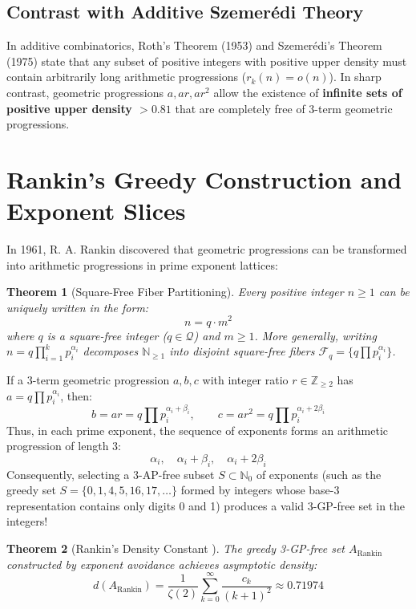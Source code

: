 \documentclass[11pt,a4paper]{article}
\newtheorem{theorem}{Theorem}[section]
\theoremstyle{definition}
\begin{document}
\subsection{Contrast with Additive Szemer\'edi Theory}
In additive combinatorics, Roth's Theorem (1953) and Szemer\'edi's Theorem (1975) state that any subset of positive integers with positive upper density must contain arbitrarily long arithmetic progressions ($r_k(n) = o(n)$).
In sharp contrast, geometric progressions $a, ar, ar^2$ allow the existence of \textbf{infinite sets of positive upper density $> 0.81$} that are completely free of 3-term geometric progressions.

\section{Rankin's Greedy Construction and Exponent Slices}

In 1961, R. A. Rankin \cite{rankin1961} discovered that geometric progressions can be transformed into arithmetic progressions in prime exponent lattices:

\begin{theorem}[Square-Free Fiber Partitioning]\label{thm:rankin_fiber}
Every positive integer $n \ge 1$ can be uniquely written in the form:
\[ n = q \cdot m^2 \]
where $q$ is a square-free integer ($q \in \mathcal{Q}$) and $m \ge 1$.
More generally, writing $n = q \prod_{i=1}^k p_i^{\alpha_i}$ decomposes $\mathbb{N}_{\ge 1}$ into disjoint square-free fibers $\mathcal{F}_q = \{ q \prod p_i^{\alpha_i} \}$.
\end{theorem}

If a 3-term geometric progression $a, b, c$ with integer ratio $r \in \mathbb{Z}_{\ge 2}$ has $a = q \prod p_i^{\alpha_i}$, then:
\[ b = a r = q \prod p_i^{\alpha_i + \beta_i}, \qquad c = a r^2 = q \prod p_i^{\alpha_i + 2\beta_i} \]
Thus, in each prime exponent, the sequence of exponents forms an arithmetic progression of length 3:
\[ \alpha_i, \quad \alpha_i + \beta_i, \quad \alpha_i + 2\beta_i \]
Consequently, selecting a 3-AP-free subset $S \subset \mathbb{N}_0$ of exponents (such as the greedy set $S = \{0, 1, 4, 5, 16, 17, \dots\}$ formed by integers whose base-3 representation contains only digits 0 and 1) produces a valid 3-GP-free set in the integers!

\begin{theorem}[Rankin's Density Constant \cite{rankin1961}]\label{thm:rankin_constant}
The greedy 3-GP-free set $A_{\text{Rankin}}$ constructed by exponent avoidance achieves asymptotic density:
\begin{equation}\label{eq:rankin_density}
d(A_{\text{Rankin}}) = \frac{1}{\zeta(2)} \sum_{k=0}^\infty \frac{c_k}{(k+1)^2} \approx 0.71974
\end{equation}
\end{theorem}
\end{document}
